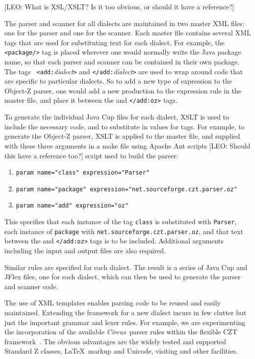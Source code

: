 \documentclass{llncs}
\newcommand{\Circus}{{\sf\slshape Circus}}
\begin{document}
  [LEO: What is XSL/XSLT? Is it too obvious, or should it have a reference?]

The parser and scanner for all dialects are maintained in two master
XML files: one for the parser and one for the scanner. Each master
file contains several XML tags that are used for substituting text for
each dialect. For example, the {\tt <package/>} tag is placed wherever
one would normally write the Java package name, so that each parser
and scanner can be contained in their own package. The tags {\tt
<add:}{\em dialect}{\tt >} and {\tt </add:}{\em dialect}{\tt >} are
used to wrap around code that are specific to particular dialects. So
to add a new type of expression to the Object-Z parser, one would add
a new production to the expression rule in the master file, and place
it between the {\tt <add:oz>} and {\tt </add:oz>} tags.

To generate the individual Java Cup files for each dialect, XSLT is
used to include the necessary code, and to substitute in values for
tags. For example, to generate the Object-Z parser, XSLT is applied to
the master file, and supplied with these three arguments in a make file
using Apache Ant scripts [LEO: Should this have a reference too?]
script used to build the parser:
\begin{enumerate}
  \item {\tt param name="class" expression="Parser"}
  \item {\tt param name="package" expression="net.sourceforge.czt.parser.oz"}
  \item {\tt param name="add" expression="{oz}"}
\end{enumerate}

This specifies that each instance of the tag {\tt class} is
substituted with {\tt Parser}, each instance of {\tt package} with
{\tt net.sourceforge.czt.parser.oz}, and that text between the
{\tt <add:oz>} and {\tt </add:oz>} tags is to be included. Additional
arguments including the input and output files are also required.

Similar rules are specified for each dialect. The result is a series
of Java Cup and JFlex files, one for each dialect, which can then be
used to generate the parser and scanner code.

The use of XML templates enables parsing code to be reused and easily maintained.
Extending the framework for a new dialect incurs in few clutter but just the important
grammar and lexer rules.
For example, we are experimenting the incorporation of the available \Circus\ parser
rules within the flexible CZT framework~\cite{circus.other:parser}. The obvious advantages
are the widely tested and supported Standard Z classes, \LaTeX\ markup and Unicode,
visiting and other facilities.
\end{document}
